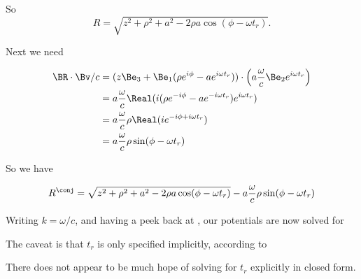 {So
\begin{equation}\label{eqn:relativisticElectrodynamicsExamReflection:130}
R = \sqrt{z^2 + \rho^2 + a^2 - 2 \rho a \cos( \phi - \omega t_r ) }.
\end{equation}

Next we need

\begin{equation}\label{eqn:relativisticElectrodynamicsExamReflection:1070}
\begin{aligned}
\BR \cdot \Bv/c
&= 
(z \Be_3 + \Be_1 (\rho e^{i \phi} - a e^{i \omega t_r} )) \cdot  
\left(a \frac{\omega}{c} \Be_2 e^{i \omega t_r} \right) \\
&=
a \frac{\omega }{c}
\Real(
i (\rho e^{-i \phi} - a e^{-i \omega t_r} ) e^{i \omega t_r} ) \\
&=
a \frac{\omega }{c}
\rho \Real( i e^{-i \phi + i \omega t_r} ) \\
&=
a \frac{\omega }{c}
\rho \sin(\phi - \omega t_r)
\end{aligned}
\end{equation}

So we have

\begin{equation}\label{eqn:relativisticElectrodynamicsExamReflection:150}
R^\conj = \sqrt{z^2 + \rho^2 + a^2 - 2 \rho a \cos( \phi - \omega t_r ) }
-a \frac{\omega }{c} \rho \sin(\phi - \omega t_r)
\end{equation}

Writing $k = \omega/c$, and having a peek back at , our potentials are now solved for


The caveat is that $t_r$ is only specified implicitly, according to


There does not appear to be much hope of solving for $t_r$ explicitly in closed form.


}
